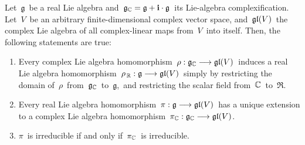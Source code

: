 
\begin{proposition}
\label{propnIrreducibleComplexRepresentationsOfRealLieAlgebras}
\mbox{}
\vskip 0.05cm
\noindent
Let \,$\mathfrak{g}$\, be a real Lie algebra and
\,$\mathfrak{g}_{\mathbb{C}} = \mathfrak{g} + \textnormal{\bf i}\cdot\mathfrak{g}$\,
its Lie-algebra complexification.
Let \,$V$\, be an arbitrary finite-dimensional complex vector space,
and \,$\mathfrak{gl}(V)$\, the complex Lie algebra of all complex-linear maps from \,$V$\, into itself.
Then, the following statements are true:
\begin{enumerate}
\item
	Every complex Lie algebra homomorphism
	\,$\rho : \mathfrak{g}_{\mathbb{C}} \longrightarrow \mathfrak{gl}(V)$\,
	induces a real Lie algebra homomorphism
	\,$\rho_{\,\mathbb{R}} : \mathfrak{g} \longrightarrow \mathfrak{gl}(V)$\,
	simply by restricting the domain of
	\,$\rho$\, from \,$\mathfrak{g}_{\mathbb{C}}$\, to \,$\mathfrak{g}$,\,
	and restricting the scalar field from \,$\mathbb{C}$\, to \,$\Re$.\, 
\item
	Every real Lie algebra homomorphism
	\,$\pi : \mathfrak{g} \longrightarrow \mathfrak{gl}(V)$\,
	has a unique extension to a complex Lie algebra homomorphism
	\,$\pi_{\mathbb{C}} : \mathfrak{g}_{\mathbb{C}} \longrightarrow \mathfrak{gl}(V)$.\,
\item
	$\pi$\, is irreducible if and only if \,$\pi_{\mathbb{C}}$\, is irreducible.
\end{enumerate}
\end{proposition}
\proof
